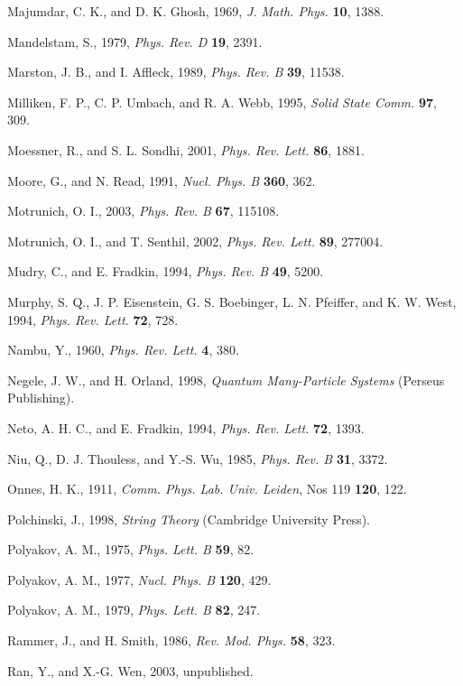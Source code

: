 \begin{list}{}{\setlength{\leftmargin}{2em}\setlength{\itemindent}{-2em}}
\item Majumdar, C. K., and D. K. Ghosh, 1969, \emph{J. Math. Phys.} \textbf{10}, 1388.
\item Mandelstam, S., 1979, \emph{Phys. Rev. D} \textbf{19}, 2391.
\item Marston, J. B., and I. Affleck, 1989, \emph{Phys. Rev. B} \textbf{39}, 11538.
\item Milliken, F. P., C. P. Umbach, and R. A. Webb, 1995, \emph{Solid State Comm.} \textbf{97}, 309.
\item Moessner, R., and S. L. Sondhi, 2001, \emph{Phys. Rev. Lett.} \textbf{86}, 1881.
\item Moore, G., and N. Read, 1991, \emph{Nucl. Phys. B} \textbf{360}, 362.
\item Motrunich, O. I., 2003, \emph{Phys. Rev. B} \textbf{67}, 115108.
\item Motrunich, O. I., and T. Senthil, 2002, \emph{Phys. Rev. Lett.} \textbf{89}, 277004.
\item Mudry, C., and E. Fradkin, 1994, \emph{Phys. Rev. B} \textbf{49}, 5200.
\item Murphy, S. Q., J. P. Eisenstein, G. S. Boebinger, L. N. Pfeiffer, and K. W. West, 1994, \emph{Phys. Rev. Lett.} \textbf{72}, 728.
\item Nambu, Y., 1960, \emph{Phys. Rev. Lett.} \textbf{4}, 380.
\item Negele, J. W., and H. Orland, 1998, \emph{Quantum Many-Particle Systems} (Perseus Publishing).
\item Neto, A. H. C., and E. Fradkin, 1994, \emph{Phys. Rev. Lett.} \textbf{72}, 1393.
\item Niu, Q., D. J. Thouless, and Y.-S. Wu, 1985, \emph{Phys. Rev. B} \textbf{31}, 3372.
\item Onnes, H. K., 1911, \emph{Comm. Phys. Lab. Univ. Leiden}, Nos 119 \textbf{120}, 122.
\item Polchinski, J., 1998, \emph{String Theory} (Cambridge University Press).
\item Polyakov, A. M., 1975, \emph{Phys. Lett. B} \textbf{59}, 82.
\item Polyakov, A. M., 1977, \emph{Nucl. Phys. B} \textbf{120}, 429.
\item Polyakov, A. M., 1979, \emph{Phys. Lett. B} \textbf{82}, 247.
\item Rammer, J., and H. Smith, 1986, \emph{Rev. Mod. Phys.} \textbf{58}, 323.
\item Ran, Y., and X.-G. Wen, 2003, unpublished.

\end{list}
